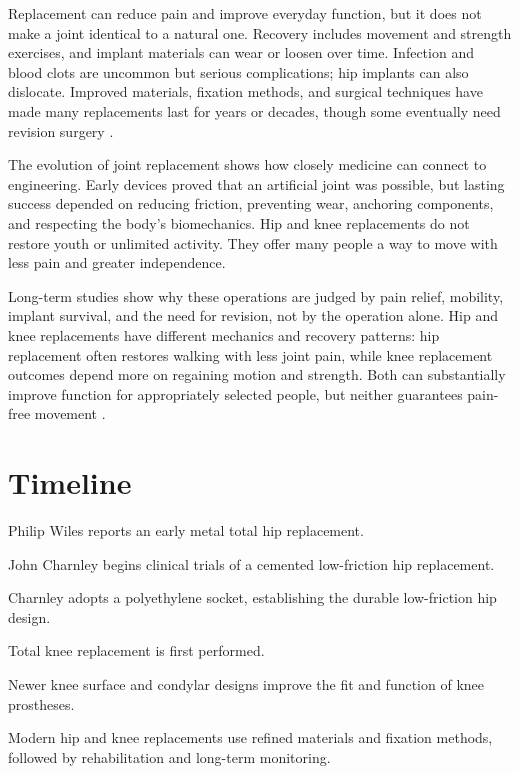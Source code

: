 \documentclass[12pt,oneside]{book}
\begin{document}
Replacement can reduce pain and improve everyday function, but it does not
make a joint identical to a natural one. Recovery includes movement and
strength exercises, and implant materials can wear or loosen over time.
Infection and blood clots are uncommon but serious complications; hip
implants can also dislocate. Improved materials, fixation methods, and
surgical techniques have made many replacements last for years or decades,
though some eventually need revision surgery
\cite{aaosHipReplacement,aaosKneeReplacement,hipArthroplastyHistory}.

The evolution of joint replacement shows how closely medicine can connect
to engineering. Early devices proved that an artificial joint was
possible, but lasting success depended on reducing friction, preventing
wear, anchoring components, and respecting the body's biomechanics. Hip
and knee replacements do not restore youth or unlimited activity. They
offer many people a way to move with less pain and greater independence.

Long-term studies show why these operations are judged by pain relief,
mobility, implant survival, and the need for revision, not by the operation
alone. Hip and knee replacements have different mechanics and recovery
patterns: hip replacement often restores walking with less joint pain, while
knee replacement outcomes depend more on regaining motion and strength. Both
can substantially improve function for appropriately selected people, but
neither guarantees pain-free movement
\cite{aaosHipReplacement,aaosKneeReplacement}.

\section*{Timeline}
\begin{description}[leftmargin=2.3cm,style=nextline]
  \item[1938] Philip Wiles reports an early metal total hip replacement.
  \item[1959] John Charnley begins clinical trials of a cemented low-friction hip replacement.
  \item[1962] Charnley adopts a polyethylene socket, establishing the durable low-friction hip design.
  \item[1968] Total knee replacement is first performed.
  \item[Early 1970s] Newer knee surface and condylar designs improve the fit and function of knee prostheses.
  \item[Today] Modern hip and knee replacements use refined materials and fixation methods, followed by rehabilitation and long-term monitoring.
\end{description}
\end{document}
